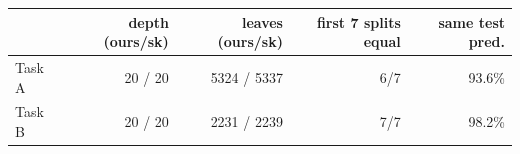 \begin{tabular}{@{}lrrrr@{}}
\toprule
 & depth (ours/sk) & leaves (ours/sk) & first 7 splits equal & same test pred. \\
\midrule
Task A & 20 / 20 & 5324 / 5337 & 6/7 & 93.6\% \\
Task B & 20 / 20 & 2231 / 2239 & 7/7 & 98.2\% \\
\bottomrule
\end{tabular}

